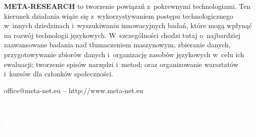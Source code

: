 \begin{multicols}{2}
\textbf{META-RESEARCH} to tworzenie powiązań z~pokrewnymi
technologiami. Ten kierunek działania wiąże się z~wykorzystywaniem
postępu technologicznego w~innych dziedzinach i~wyszukiwaniu
innowacyjnych badań, które mogą wpłynąć na rozwój technologii
językowych. W~szczególności chodzi tutaj o~najbardziej zaawansowane
badania nad tłumaczeniem maszynowym, zbieranie danych,
przygotowywanie zbiorów danych i~organizację zasobów językowych
w~celu ich ewaluacji; tworzenie spisów narzędzi i~metod; oraz
organizowanie warsztatów i~kursów dla członków społeczności. 

\centerline{office@meta-net.eu -- http://www.meta-net.eu} 

\end{multicols} 

\vfill 

\makeatletter {} {
\renewcommand*{\theHsection}{\thepart.\thesection}} \makeatother
\part*{\textcolor{white}{English}} \setcounter{section}{0}
\setcounter{figure}{0} 


\cleardoublepage 



